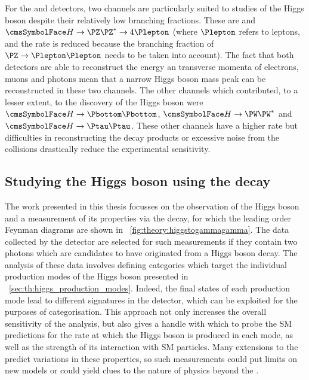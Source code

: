 For the \CMS and \ATLAS detectors, two channels are particularly suited to studies of the Higgs boson despite their relatively low branching fractions. These are \Hgg and $\PH \rightarrow \PZ \PZ^{*} \rightarrow 4 \Plepton $ (where $\Plepton$ refers to leptons, and the rate is reduced because the branching fraction of $\PZ\rightarrow \Plepton\Plepton$ needs to be taken into account). The fact that both detectors are able to reconstruct the energy an transverse momenta of electrons, muons and photons mean that a narrow Higgs boson mass peak can be reconstructed in these two channels. The other channels which contributed, to a lesser extent, to the discovery of the Higgs boson were $\PH \rightarrow \Pbottom \Pbottom$, $\PH \rightarrow \PW \PW^{*} $ and  $\PH \rightarrow \Ptau \Ptau$. %
These other channels have a higher rate but difficulties in reconstructing the decay products or excessive noise from the \LHC \pp collisions drastically reduce the experimental sensitivity. 



\subsection{Studying the Higgs boson using the \Hgg decay}

The work presented in this thesis focusses on the observation of the Higgs boson and a measurement of its properties via the \Hgg decay, for which the leading order Feynman diagrams are shown in \Fig~\ref{fig:theory:higgstogammagamma}. The data collected by the \CMS detector are selected for such measurements if they contain two photons which are candidates to have originated from a Higgs boson decay. The analysis of these data involves defining categories which target the individual production modes of the Higgs boson presented in \Sec~\ref{sec:th:higgs_production_modes}. Indeed, the final states of each production mode lead to different signatures in the detector, which can be exploited for the purposes of categorisation. This approach not only increases the overall sensitivity of the analysis, but also gives a handle with which to probe the SM predictions for the rate at which the Higgs boson is produced in each mode, as well as the strength of its interaction with SM particles. Many extensions to the \SM predict variations in these properties, so such measurements could put limits on new models or could yield clues to the nature of physics beyond the \SM.


